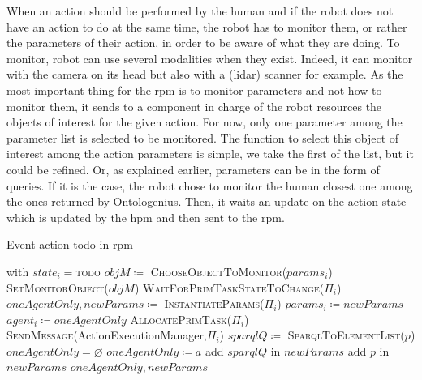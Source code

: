 \documentclass[a4paper,11pt,twoside]{StyleThese}
\begin{document}
When an action should be performed by the human and if the robot does not have an action to do at the same time, the robot has to monitor them, or rather the parameters of their action, in order to be aware of what they are doing. To monitor, robot can use several modalities when they exist. Indeed, it can monitor with the camera on its head but also with a (lidar) scanner for example. As the most important thing for the \acrshort{rpm} is to monitor parameters and not how to monitor them, it sends to a component in charge of the robot resources the objects of interest for the given action. For now, only one parameter among the parameter list is selected to be monitored. The function to select this object of interest among the action parameters is simple, we take the first of the list, but it could be refined. Or, as explained earlier, parameters can be in the form of \sparql{} queries. If it is the case, the robot chose to monitor the human closest one among the ones returned by Ontologenius. Then, it waits an update on the action state -- which is updated by the \acrfull{hpm} and then sent to the \acrshort{rpm}.


\begin{algorithm}[!htb]
	\caption{Event action todo in \acrshort{rpm}}
	\label{chap6:algo:todo}
	\begin{algorithmic}
	 with $state_i=$\textsc{todo}
	\State $objM \coloneqq$ \textsc{ChooseObjectToMonitor($params_i$)}
	\State \textsc{SetMonitorObject($objM$)}
	\State \textsc{WaitForPrimTaskStateToChange($\Pi_i$)}
		\State $oneAgentOnly,newParams\coloneqq$ \textsc{InstantiateParams}($\Pi_i$)
		\State $params_i \coloneqq newParams$
		\EndIf
			\State $agent_i \coloneqq oneAgentOnly$ 
		\Else
			\State \textsc{AllocatePrimTask}($\Pi_i$)
			 \State \textsc{SendMessage}(ActionExecutionManager,$\Pi_i$)
			 \EndIf
		\EndIf
	\EndIf
	\EndFunction
	\Statex
		\State $sparqlQ \coloneqq$ \textsc{SparqlToElementList($p$)} 
		\State $oneAgentOnly = \varnothing$
			\State $oneAgentOnly \coloneqq a$
		\EndIf
		\State add $sparqlQ$ in $newParams$
	\Else
		\State add $p$ in $newParams$
	\EndIf
	\EndFor
	\State \Return $oneAgentOnly,newParams$
	\EndFunction
\end{algorithmic}
\end{algorithm}
\end{document}
